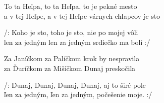 
\ve{}
To ta Heľpa, to ta Heľpa, to je pekné mesto\\
a v tej Heľpe, a v tej Heľpe várnych chlapcov je sto

\cho{}
/: Koho je sto, toho je sto, nie po mojej vôli\\
len za jedným len za jedným srdiečko ma bolí :/

\ve{}
Za Janíčkom za Palíčkom krok by nespravila\\
za Ďuríčkom za Mišíčkom Dunaj preskočila

\cho{}
/: Dunaj, Dunaj, Dunaj, Dunaj, aj to širé pole\\
ľen za jedným, ľen za jedným, počešenie moje. :/

\esong{}